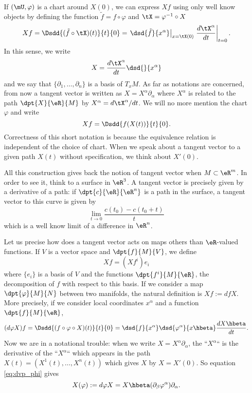 If $(\mU,\varphi)$ is a chart around $X(0)$, we can express $Xf$ using only well know objects by defining the function $\tilde f =f\circ\varphi$ and $\tX=\varphi^{-1}\circ X$
\[
  Xf=\Dsdd{ (\tilde f \circ\tX)(t) }{t}{0}=\left.\dsd{\tilde f }{x^{\alpha}}\right|_{x=\tX(0)}\left.\frac{d\tX^{\alpha}}{dt}\right|_{t=0}.
\]
In this sense, we write
\begin{equation}
  X=\frac{d\tX^{\alpha}}{dt} \dsd{}{x^{\alpha}}
\end{equation}
and we say that $\{\partial_1,\ldots,\partial_n\}$ is a basis of $T_xM$. As far as notations are concerned, from now a tangent vector is written as $X=X^{\alpha}\partial_{\alpha}$ where $X^{\alpha}$ is related to the path $\dpt{X}{\eR}{M}$ by $X^{\alpha}=d\tX^{\alpha}/dt$. We will no more mention the chart $\varphi$ and write
\[
  Xf=\Dsdd{f(X(t))}{t}{0}.
\]
Correctness of this short notation is because the equivalence relation is independent of the choice of chart. When we speak about a tangent vector to a given path $X(t)$ without specification, we think about $X'(0)$.

All this construction gives back the notion of tangent vector when $M\subset \eR^m$. In order to see it, think to a surface in $\eR^3$. A tangent vector is precisely given by a derivative of a path: if $\dpt{c}{\eR}{\eR^n}$ is a path in the surface, a tangent vector to this curve is given by
\[
   \lim_{t\to 0}\frac{c(t_0)-c(t_0+t)}{t}
\]
which is a well know limit of a difference in $\eR^n$.

\label{pg:vecto_vecto}Let us precise how does a tangent vector acts on maps others than $\eR$-valued functions. If $V$ is a vector space and $\dpt{f}{M}{V}$, we define
\[
   Xf=(Xf^i)e_i
\]
where $\{e_i\}$ is a basis of $V$ and the functions $\dpt{f^i}{M}{\eR}$, the decomposition of $f$ with respect to this basis. If we consider a map $\dpt{\varphi}{M}{N}$ between two manifolds, the natural definition is $Xf:=dfX$. More precisely, if we consider local coordinates $x^{\alpha}$ and a function $\dpt{f}{M}{\eR}$,
\begin{equation}\label{eq:dvp_phi}
   (d\varphi X)f=\Dsdd{  (f\circ\varphi\circ X)(t) }{t}{0}=\dsd{f}{x^{\alpha}}\dsd{\varphi^{\alpha}}{x\hbeta}\frac{dX\hbeta}{dt}.
\end{equation}
Now we are in a notational trouble: when we write $X=X^{\alpha}\partial_{\alpha}$, the ``$X^{\alpha}$``{} is the derivative of the ``$X^{\alpha}$``{} which appears in the path $X(t)=(X^1(t),\ldots,X^n(t))$ which gives $X$ by $X=X'(0)$. So equation \eqref{eq:dvp_phi} gives
\begin{equation}
   X(\varphi):=d\varphi X=X\hbeta(\partial_{\beta}\varphi^{\alpha})\partial_{\alpha}.
\end{equation}

